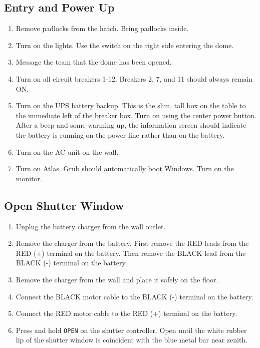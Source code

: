 \documentclass{article}
\begin{document}
		\subsection{Entry and Power Up}

			\begin{enumerate}

				\item Remove padlocks from the hatch. Bring padlocks inside.

				\item Turn on the lights. Use the switch on the right side entering the dome.

				\item Message the team that the dome has been opened.

				\item Turn on all circuit breakers 1-12. Breakers 2, 7, and 11 should always remain ON.

				\item Turn on the UPS battery backup. This is the slim, tall box on the table to the immediate left of the breaker box. Turn on using the center power button. After a beep and some warming up, the information screen should indicate the battery is running on the power line rather than on the battery.

				\item Turn on the AC unit on the wall.

				\item Turn on Atlas. Grub should automatically boot Windows. Turn on the monitor.

			\end{enumerate}

		\subsection{Open Shutter Window}

			\begin{enumerate}

				\item Unplug the battery charger from the wall outlet.

				\item Remove the charger from the battery. First remove the RED leads from the RED (+) terminal on the battery. Then remove the BLACK lead from the BLACK (-) terminal on the battery.

				\item Remove the charger from the wall and place it safely on the floor.

				\item Connect the BLACK motor cable to the BLACK (-) terminal on the battery.

				\item Connect the RED motor cable to the RED (+) terminal on the battery.

				\item Press and hold \texttt{OPEN} on the shutter controller. Open until the white rubber lip of the shutter window is coincident with the blue metal bar near zenith.

			\end{enumerate}
\end{document}
